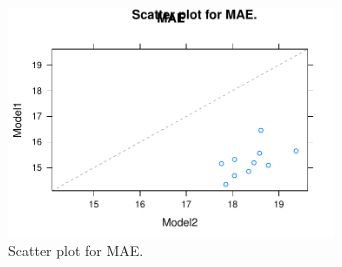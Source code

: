\begin{figure} 
\centering  
\includegraphics[width=0.77\textwidth]{Code_Outputs/ML_compare_models_xyplot_MAE.pdf} 
\caption{\label{fig:ML_compare_modelsxyplot_MAE}Scatter plot for MAE.} 
\end{figure} 
 
